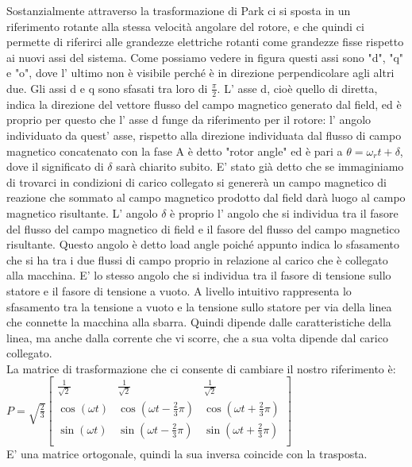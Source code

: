 \documentclass[Lau,noexaminfo]{sapthesis}
\begin{document}
	Sostanzialmente attraverso la trasformazione di Park ci si sposta in un riferimento rotante alla stessa velocità angolare del rotore, e che quindi ci permette di riferirci alle grandezze elettriche rotanti come grandezze fisse rispetto ai nuovi assi del sistema. Come possiamo vedere in figura questi assi sono "d", "q" e "o", dove l' ultimo non è visibile perché è in direzione perpendicolare agli altri due. Gli assi d e q sono sfasati tra loro di $\frac{\pi}{2}$. L' asse d, cioè quello di diretta, indica la direzione del vettore flusso del campo magnetico generato dal field, ed è proprio per questo che l' asse d funge da riferimento per il rotore: l' angolo individuato da quest' asse, rispetto alla direzione individuata dal flusso di campo magnetico concatenato con la fase A è detto "rotor angle" ed è pari a $\theta=\omega_r t+\delta $, dove il significato di $\delta$ sarà chiarito subito. E' stato già detto che se immaginiamo di trovarci in condizioni di carico collegato si genererà un campo magnetico di reazione che sommato al campo magnetico prodotto dal field darà luogo al campo magnetico risultante. L' angolo $\delta$ è proprio l' angolo che si individua tra il fasore del flusso del campo magnetico di field e il fasore del flusso del campo magnetico risultante. Questo angolo è detto load angle poiché appunto indica lo sfasamento che si ha tra i due flussi di campo proprio in relazione al carico che è collegato alla macchina. E' lo stesso angolo che si individua tra il fasore di tensione sullo statore e il fasore di tensione a vuoto. A livello intuitivo rappresenta lo sfasamento tra la tensione a vuoto e la tensione sullo statore per via della linea che connette la macchina alla sbarra. Quindi dipende dalle caratteristiche della linea, ma anche dalla corrente che vi scorre, che a sua volta dipende dal carico collegato.\\
	La matrice di trasformazione che ci consente di cambiare il nostro riferimento è:\\
	$P=\sqrt{\frac{2}{3}}\begin{bmatrix}
		\frac{1}{\sqrt2} & \frac{1}{\sqrt2} & \frac{1}{\sqrt2} \\
		\cos(\omega t) & \cos(\omega t -\frac{2}{3}\pi) & \cos(\omega t +\frac{2}{3}\pi) \\
		\sin(\omega t) & \sin(\omega t -\frac{2}{3}\pi) & \sin(\omega t +\frac{2}{3}\pi) \\
		
	\end{bmatrix}$\\
	E' una matrice ortogonale, quindi la sua inversa coincide con la trasposta.
\end{document}
